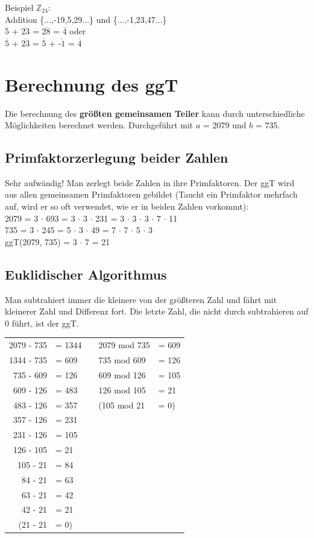 Beispiel $\mathbb{Z}_{24}$: \\
Addition \{...,-19,5,29...\} und \{...,-1,23,47...\} \\
$\overline{\text{5}}$ + $\overline{\text{23}}$ = $\overline{\text{28}}$ = $\overline{\text{4}}$ oder \\
$\overline{\text{5}}$ + $\overline{\text{23}}$ = $\overline{\text{5}}$ + $\overline{\text{-1}}$ = $\overline{\text{4}}$

\section{Berechnung des ggT}
Die berechnung des \textbf{größten gemeinsamen Teiler} kann durch unterschiedliche Möglichkeiten berechnet werden. Durchgeführt mit $a$ = 2079 und $b$ = 735.

\subsection{Primfaktorzerlegung beider Zahlen}
Sehr aufwändig! Man zerlegt beide Zahlen in ihre Primfaktoren. Der ggT wird aus allen gemeinsamen Primfaktoren gebildet (Taucht ein Primfaktor mehrfach auf, wird er so oft verwendet, wie er in beiden Zahlen vorkommt): \\
2079 = 3 $\cdot$ 693 = 3 $\cdot$ 3 $\cdot$ 231 = 3 $\cdot$ 3 $\cdot$ 3 $\cdot$ 7 $\cdot$ 11 \\
735 = 3 $\cdot$ 245 = 5 $\cdot$ 3 $\cdot$ 49 = 7 $\cdot$ 7 $\cdot$ 5 $\cdot$ 3 \\
ggT(2079, 735) = 3 $\cdot$ 7 = 21

\subsection{Euklidischer Algorithmus}
Man subtrahiert immer die kleinere von der größteren Zahl und fährt mit kleinerer Zahl und Differenz fort. Die letzte Zahl, die nicht durch subtrahieren auf 0 führt, ist der ggT.
\begin{tabular}{rllll}
	2079 - 735 & = 1344 &  & 2079 mod 735 & = 609 \\
	1344 - 735 & = 609 &  & 735 mod 609 & = 126 \\
	735 - 609 & = 126 &  & 609 mod 126 & = 105 \\
	609 - 126 & = 483 &  & 126 mod 105 & = 21 \\
	483 - 126 & = 357 &  & (105 mod 21 & = 0) \\
	357 - 126 & = 231 &  &  &  \\
	231 - 126 & = 105 &  &  &  \\
	126 - 105 & = 21 &  &  &  \\
	105 - 21 & = 84 &  &  &  \\
	84 - 21 & = 63 &  &  &  \\
	63 - 21 & = 42 &  &  &  \\
	42 - 21 & = 21 &  &  &  \\
	(21 - 21 & = 0) &  &  &  \\
\end{tabular}

